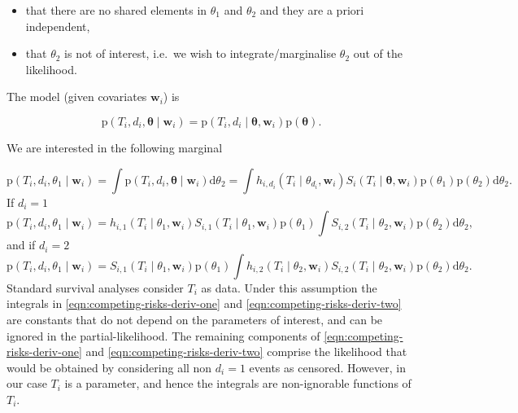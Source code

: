 \documentclass[
  10pt,
  a4paper,
]{article}
\providecommand{\tightlist}{%
  \setlength{\itemsep}{0pt}\setlength{\parskip}{0pt}}
\newcommand{\pd}{\text{p}}
\begin{document}
\begin{itemize}
\tightlist
\item
  that there are no shared elements in \(\theta_{1}\) and \(\theta_{2}\)
  and they are a priori independent,
\item
  that \(\theta_{2}\) is not of interest, i.e.~we wish to
  integrate/marginalise \(\theta_{2}\) out of the likelihood.
\end{itemize}

The model (given covariates \(\boldsymbol{w}_{i}\)) is

\begin{equation}
  \pd(T_{i}, d_{i}, \boldsymbol{\theta} \mid \boldsymbol{w}_{i}) =
    \pd(T_{i}, d_{i} \mid \boldsymbol{\theta}, \boldsymbol{w}_{i})\pd(\boldsymbol{\theta}).
\end{equation}

We are interested in the following marginal

\begin{equation}
  \pd(T_{i}, d_{i}, \theta_{1} \mid \boldsymbol{w}_{i})
  = \int \pd(T_{i}, d_{i}, \boldsymbol{\theta} \mid \boldsymbol{w}_{i}) \text{d}\theta_{2}
  = \int h_{i, d_{i}}(T_{i} \mid \theta_{d_{i}}, \boldsymbol{w}_{i}) S_{i}(T_{i} \mid \boldsymbol{\theta}, \boldsymbol{w}_{i}) \pd(\theta_{1}) \pd(\theta_{2}) \text{d}\theta_{2}.
\end{equation} If \(d_{i} = 1\) \begin{equation}
  \pd(T_{i}, d_{i}, \theta_{1} \mid \boldsymbol{w}_{i})
  = h_{i, 1}(T_{i} \mid \theta_{1}, \boldsymbol{w}_{i}) S_{i, 1}(T_{i} \mid \theta_{1}, \boldsymbol{w}_{i}) \pd(\theta_{1}) \int S_{i, 2}(T_{i} \mid \theta_{2}, \boldsymbol{w}_{i}) \pd(\theta_{2}) \text{d} \theta_{2},
  \label{eqn:competing-risks-deriv-one}
\end{equation} and if \(d_{i} = 2\) \begin{equation}
  \pd(T_{i}, d_{i}, \theta_{1} \mid \boldsymbol{w}_{i})
  = S_{i, 1}(T_{i} \mid \theta_{1}, \boldsymbol{w}_{i}) \pd(\theta_{1}) \int h_{i, 2}(T_{i} \mid \theta_{2}, \boldsymbol{w}_{i}) S_{i, 2}(T_{i} \mid \theta_{2}, \boldsymbol{w}_{i}) \pd(\theta_{2}) \text{d} \theta_{2}.
  \label{eqn:competing-risks-deriv-two}
\end{equation} Standard survival analyses consider \(T_{i}\) as data.
Under this assumption the integrals in
\eqref{eqn:competing-risks-deriv-one} and
\eqref{eqn:competing-risks-deriv-two} are constants that do not depend
on the parameters of interest, and can be ignored in the
partial-likelihood. The remaining components of
\eqref{eqn:competing-risks-deriv-one} and
\eqref{eqn:competing-risks-deriv-two} comprise the likelihood that would
be obtained by considering all non \(d_{i} = 1\) events as censored.
However, in our case \(T_{i}\) is a parameter, and hence the integrals
are non-ignorable functions of \(T_{i}\).
\end{document}
